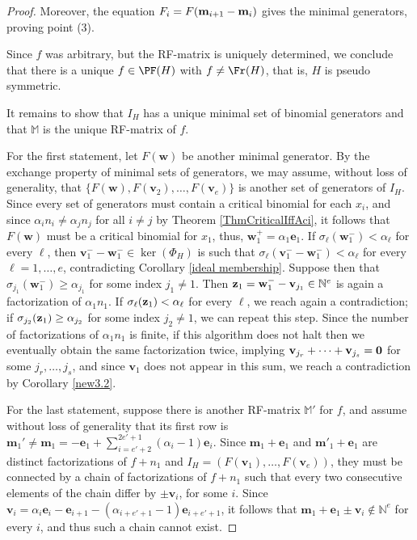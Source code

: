 \documentclass[11pt,twoside]{amsart}
\newcommand{\N}{\mathbb N}
\def\bv{{\mathbf v}}
\def\bw{{\mathbf w}}
\def\be{{\mathbf e}}
\def\bm{{\mathbf m}}
\def\bbM{{\mathbb M}}
\theoremstyle{definition}
\numberwithin{equation}{section}
\begin{document}
\begin{proof}
Moreover, the equation $F_i = F({\bf m}_{i+1}-{\bf m}_i)$ gives the minimal generators, proving point (3).

Since $f$ was arbitrary, but the RF-matrix is uniquely determined, we conclude that there is  a unique $f \in \PF(H)$ with $f \ne \Fr(H)$,
that is, $H$ is pseudo symmetric.

It remains to show that $I_H$ has a unique minimal set of binomial generators and that $\bbM$ is the unique RF-matrix of $f$.

For the first statement,
 let $F(\bw)$ be another minimal generator. 
By the exchange property of minimal sets of generators, we may assume, without loss of generality, that $\{F(\bw), F(\bv_2),\ldots,F(\bv_e)\}$ is another set of generators of $I_H$.
Since every set of generators must contain a critical binomial for each $x_i$, and since $\alpha_i n_i \ne \alpha_j n_j $ for all $i \ne j$ by Theorem \ref{ThmCriticalIffAci}, it follows that $F(\bw)$ must be a critical binomial for $x_1$, thus,  $\bw_1^+=\alpha_1\be_1$. 
If $\sigma_\ell(\bw_1^-) < \alpha_\ell$ for every $\ell$, then $\bv_1^--\bw_1^- \in \ker(\Phi_H)$ is such that $\sigma_\ell(\bv_1^--\bw_1^-) < \alpha_\ell$ for every $\ell=1,\ldots,e$,
 contradicting Corollary \ref{ideal membership}.
Suppose then that $\sigma_{j_1}(\bw^-_1) \geq \alpha_{j_1}$ for some index $j_1 \ne 1$. 
Then ${\bf z}_1=\bw_1^- -\bv_{j_1} \in \N^e$ is again a factorization of $\alpha_1n_1$. 
If $\sigma_\ell({\bf z}_1) < \alpha_\ell$ for every $\ell$, 
we reach again a contradiction; 
 if $\sigma_{j_2}({\bf z}_1) \geq \alpha_{j_2}$ for some index $j_2 \ne 1$, we can repeat this step. 
 Since the number of factorizations of $\alpha_1n_1$ is finite, if this algorithm does not halt then we eventually obtain the same factorization twice, implying $\bv_{j_r}+\cdots+\bv_{j_s} = {\bf 0}$ for some  $j_r,\ldots,j_s$, and since $\bv_1$ does not appear in this sum, we reach a contradiction by Corollary \ref{new3.2}.

 For the last statement,
 suppose  there is another RF-matrix $\bbM'$ for $f$, 
 and assume without loss of generality that its first row is $\bm_1'\ne\bm_1 =-\be_1+\sum_{i=e'+2}^{2e'+1} (\alpha_i-1)\be_i.$
Since $\bm_1+\be_1$ and $\bm'_1+\be_1$ are distinct factorizations of $f+n_1$ and $I_H=(F(\bv_1),\ldots,F(\bv_e))$, 
they must be connected by a chain of factorizations of $f+n_1$   such that every two consecutive elements of the chain  differ by $\pm \bv_i$, for some  $i$. 
Since $\bv_i = \alpha_i\be_i-\be_{i+1}- (\alpha_{i+e'+1}-1)\be_{i+e'+1}$,
it follows  that $\bm_1+\be_1 \pm \bv_i \notin \N^e$ for every $i$, and thus such a chain cannot exist. 
\end{proof}
\end{document}
